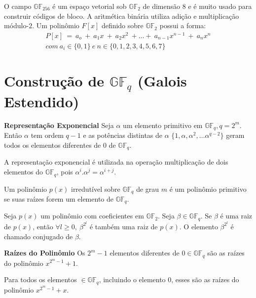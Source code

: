 O campo $\mathbb{GF}_{256}$ é um espaço vetorial sob $\mathbb{GF}_2$ de dimensão $8$ e é muito usado para construir códigos de bloco. A aritmética
binária utiliza adição e multiplicação módulo-$2$. Um polinômio $F[x]$ definido sobre $\mathbb{GF}_2$ possui a forma:
\begin{align*}
P[x]\ =\ a_o\ +\ a_1x\ +\ a_2x^2\ + \ldots +\ a_{n-1}x^{n-1}\ +\ a_nx^n\\
com\ a_i \in \{0, 1\}\ e\ n \in \{0, 1, 2, 3, 4, 5, 6, 7\}
\end{align*}


\section{Construção de $\mathbb{GF}_q$ (Galois Estendido)}

\begin{definition} {\bf Representação Exponencial} \label{RepExp}  Seja $\alpha$ um elemento primitivo em $\mathbb{GF}_q, q=2^m$. Então $\alpha$ tem ordem $q -1$ e as potências distintas de $\alpha$ $\{ 1, \alpha, \alpha^2, \ldots \alpha^{q-2}\}$ geram todos os elementos diferentes de $0$ de $\mathbb{GF}_q$.

A representação exponencial é utilizada na operação multiplicação de dois elementos do $\mathbb{GF}_q$, pois $\alpha^i.\alpha^j=\alpha^{i+j}$.

\end{definition}

\begin{definition} Um polinômio $p(x)$ irredutível sobre $\mathbb{GF}_q$ de grau $m$ é um polinômio primitivo se suas raízes forem um elemento de $\mathbb{GF}_q$.
\end{definition}

\begin{definition} Seja $p(x)$ um polinômio com coeficientes em $\mathbb{GF}_2$. Seja $\beta \in \mathbb{GF}_q$. Se $\beta$ é uma raiz de $p(x)$, então $\forall l \geq 0,\ \beta^{2^{l}}$ é também uma raiz de $p(x)$. O elemento $\beta^{2^{l}}$ é chamado conjugado de $\beta$.
\end{definition}

\begin{theorem} {\bf Raízes do Polinômio} \label{RaiPol}  Os $2^m -1$ elementos diferentes de $0 \in \mathbb{GF}_q$ são as raízes do polinômio $x^{2^{m}-1} + 1$.
\end{theorem}

\begin{corollary} Para todos os elementos $ \in \mathbb{GF}_q$, incluindo o elemento $0$, esses são as raízes do polinômio $x^{2^{m}-1} + x$.
\end{corollary}

